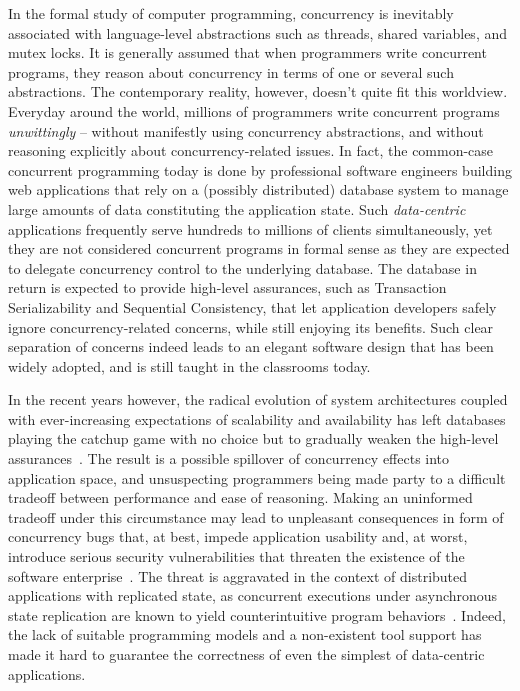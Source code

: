 In the formal study of computer programming, concurrency is inevitably
associated with language-level abstractions such as threads, shared
variables, and mutex locks. It is generally assumed that when
programmers write concurrent programs, they reason about concurrency
in terms of one or several such abstractions. The contemporary
reality, however, doesn't quite fit this worldview. Everyday around
the world, millions of programmers write concurrent programs
\emph{unwittingly} -- without manifestly using concurrency
abstractions, and without reasoning explicitly about
concurrency-related issues. In fact, the common-case concurrent
programming today is done by professional software engineers building
web applications that rely on a (possibly distributed) database system
to manage large amounts of data constituting the application state.
Such \emph{data-centric} applications frequently serve hundreds to
millions of clients simultaneously, yet they are not considered
concurrent programs in formal sense as they are expected to delegate
concurrency control to the underlying database. The database in return
is expected to provide high-level assurances, such as Transaction
Serializability and Sequential Consistency, that let application
developers safely ignore concurrency-related concerns, while still
enjoying its benefits. Such clear separation of concerns indeed leads
to an elegant software design that has been widely adopted, and is
still taught in the classrooms today. 

In the recent years however, the radical evolution of system
architectures coupled with ever-increasing expectations of scalability
and availability has left databases playing the catchup game with no
choice but to gradually weaken the high-level
assurances~\cite{bailishotos,meijer2012}. The result is a possible
spillover of concurrency effects into application space, and
unsuspecting programmers being made party to a difficult tradeoff
between performance and ease of reasoning. Making an uninformed
tradeoff under this circumstance may lead to unpleasant consequences
in form of concurrency bugs that, at best, impede application
usability and, at worst, introduce serious security vulnerabilities
that threaten the existence of the software enterprise~\cite{acidrain,
bailisferal, poloniexbug, tripwire, hackaday}. The threat is
aggravated in the context of distributed applications with replicated
state, as concurrent executions under asynchronous state replication
are known to yield counterintuitive program
behaviors~\cite{burckhardt14}. Indeed, the lack of suitable
programming models and a non-existent tool support has made it hard to
guarantee the correctness of even the simplest of data-centric
applications.

